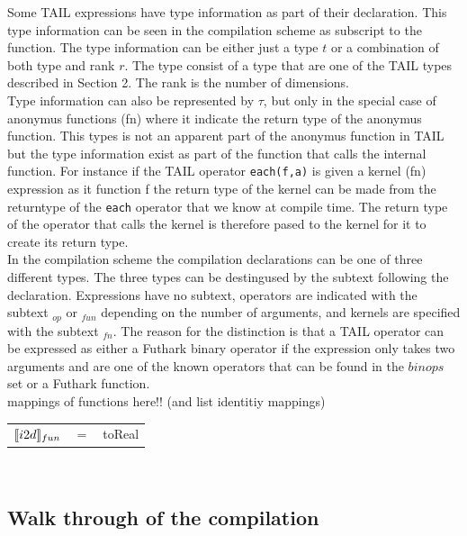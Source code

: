 \documentclass[11pt]{article}
\begin{document}
Some TAIL expressions have type information as part of their declaration. This type information can be seen in the
compilation scheme as subscript to the function. The type information can be either just a type $t$ or a combination of both type and rank $r$. The type consist of a type that are one of the TAIL
types described in Section 2. The rank is the number of dimensions.  \\

Type information can also be represented by $\tau$, but only in the special case of anonymus functions (fn) where it 
indicate the return type of the anonymus function. This types is not an apparent part of the anonymus function in TAIL
but the type information exist as part of the function that calls the internal function. For instance if the TAIL operator {\tt each(f,a)} is given a kernel (fn) expression as it function f the return type of the kernel can be made from the returntype of the {\tt each} operator that we know at compile time. The return type of the operator that calls the kernel is therefore pased to the kernel for it to create its return type. \\

In the compilation scheme the compilation declarations can be one of three different types. The three types can be destingused by the subtext following the declaration.  Expressions have no subtext, operators are indicated with the subtext $_{op}$ or $_{fun}$ depending on the number of arguments, and kernels are specified with the subtext $_{fn}$. The reason for the distinction is that a TAIL operator can be expressed as either a Futhark binary operator if the expression only takes two arguments and are one of the known operators that can be found in the $binops$ set or a Futhark function. \\



mappings of functions here!! (and list identitiy mappings)\\
\begin{tabular}{l c l}
$\llbracket i2d \rrbracket_{fun}$ & $=$ & toReal\\ 
\end{tabular}\\

\subsection{Walk through of the compilation}

%
\end{document}
